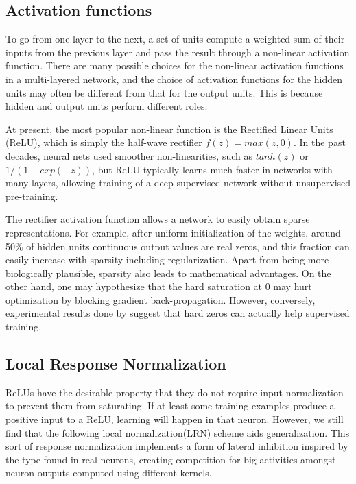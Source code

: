 \subsection{Activation functions}
To go from one layer to the next, a set of units compute a weighted sum of their inputs from the previous layer and pass the result through a non-linear activation function\cite{lecun2015deep}. There are many possible choices for the non-linear activation functions in a multi-layered network, and the choice of activation functions for the hidden units may often be different from that for the output units. This is because hidden and output units perform different roles\cite{bishop1995neural}. 

\indent At present, the most popular non-linear function is the Rectified Linear Units (ReLU), which is simply the half-wave rectifier $f(z) = max(z, 0)$. In the past decades, neural nets used smoother non-linearities, such as $tanh(z)$ or $1/(1+ exp(-z))$, but ReLU typically learns much faster in networks with many layers, allowing training of a deep supervised network without unsupervised pre-training\cite{lecun2015deep}. 

\indent The rectifier activation function allows a network to easily obtain sparse representations. For example, after uniform initialization of the weights, around 50\% of hidden units continuous output values are real zeros, and this fraction can easily increase with sparsity-including regularization. Apart from being more biologically plausible, sparsity also leads to mathematical advantages. On the other hand, one may hypothesize that the hard saturation at 0 may hurt optimization by blocking gradient back-propagation. However, conversely, experimental results done by\citeauthor{glorot2011deep} suggest that hard zeros can actually help supervised training\cite{glorot2011deep}.  

\subsection{Local Response Normalization}

ReLUs have the desirable property that they do not require input normalization to prevent them from saturating. If at least some training examples produce a positive input to a ReLU, learning will happen in that neuron. However, we still find that the following local normalization(LRN) scheme aids generalization. This sort of response normalization implements a form of lateral inhibition inspired by the type found in real neurons, creating competition for big activities amongst neuron outputs computed using different kernels\cite{krizhevsky2012imagenet}.

